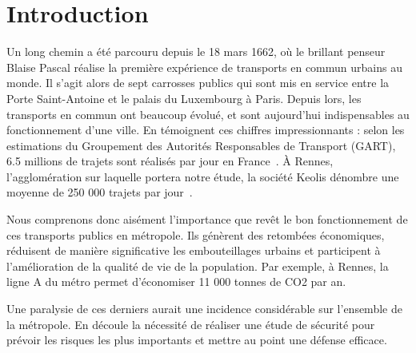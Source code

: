 \section{Introduction}
	Un long chemin a été parcouru depuis le 18 mars 1662, où le brillant penseur Blaise Pascal réalise la première expérience de transports en commun urbains au monde. Il s'agit alors de sept carrosses publics qui sont mis en service entre la Porte Saint-Antoine et le palais du Luxembourg à Paris. Depuis lors, les transports en commun ont beaucoup évolué, et sont aujourd'hui indispensables au fonctionnement d'une ville. En témoignent ces chiffres impressionnants : selon les estimations du Groupement des Autorités Responsables de Transport (GART), 6.5 millions de trajets sont réalisés par jour en France~\cite{Gart}. \`A Rennes, l'agglomération sur laquelle portera notre étude, la société Keolis dénombre une moyenne de 250 000 trajets par jour~\cite{Keolis}. 

	Nous comprenons donc aisément l'importance que revêt le bon fonctionnement de ces transports publics en métropole. Ils génèrent des retombées économiques, réduisent de manière significative les embouteillages urbains et participent à l’amélioration de la qualité de vie de la population. Par exemple, à Rennes, la ligne A du métro permet d'économiser 11 000 tonnes de CO2 par an\cite{bilanLA}. 

	Une paralysie de ces derniers aurait une incidence considérable sur l'ensemble de la métropole. En découle la nécessité de réaliser une étude de sécurité pour prévoir les risques les plus importants et mettre au point une défense efficace. 


























